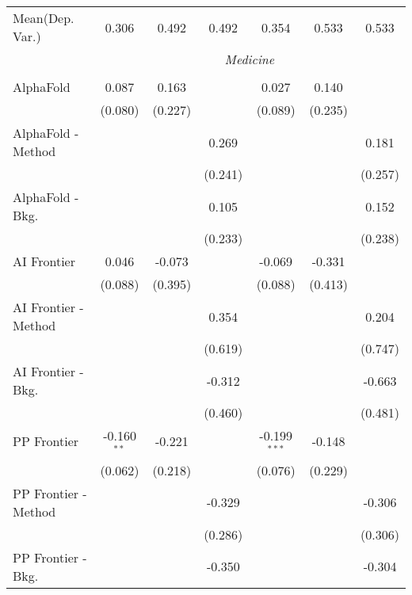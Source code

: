 \begin{tabular}{lcccccc}
Mean(Dep. Var.) & 0.306 & 0.492 & 0.492 & 0.354 & 0.533 & 0.533 \\
 & \multicolumn{6}{c}{\textit{Medicine}} \\ \\
   AlphaFold            & 0.087          & 0.163   &         & 0.027          & 0.140   &   \\   
                        & (0.080)        & (0.227) &         & (0.089)        & (0.235) &   \\   
   AlphaFold - Method   &                &         & 0.269   &                &         & 0.181\\   
                        &                &         & (0.241) &                &         & (0.257)\\   
   AlphaFold - Bkg.     &                &         & 0.105   &                &         & 0.152\\   
                        &                &         & (0.233) &                &         & (0.238)\\   
   AI Frontier          & 0.046          & -0.073  &         & -0.069         & -0.331  &   \\   
                        & (0.088)        & (0.395) &         & (0.088)        & (0.413) &   \\   
   AI Frontier - Method &                &         & 0.354   &                &         & 0.204\\   
                        &                &         & (0.619) &                &         & (0.747)\\   
   AI Frontier - Bkg.   &                &         & -0.312  &                &         & -0.663\\   
                        &                &         & (0.460) &                &         & (0.481)\\   
   PP Frontier          & -0.160$^{**}$  & -0.221  &         & -0.199$^{***}$ & -0.148  &   \\   
                        & (0.062)        & (0.218) &         & (0.076)        & (0.229) &   \\   
   PP Frontier - Method &                &         & -0.329  &                &         & -0.306\\   
                        &                &         & (0.286) &                &         & (0.306)\\   
   PP Frontier - Bkg.   &                &         & -0.350  &                &         & -0.304\\   

\end{tabular}
